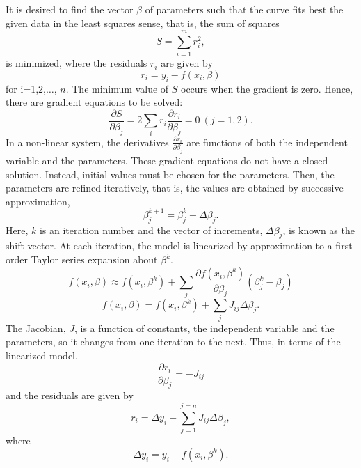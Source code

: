 \documentclass[a4paper,10pt]{report}
\begin{document}
It is desired to find the vector $\beta$ of
parameters such that the curve fits best the given data in the least
squares sense, that is, the sum of squares
\begin{equation}
    S=\sum_{i=1}^{m}r_i^2 ,
\end{equation}
is minimized, where the residuals $r_i$ are given by
\begin{equation}
    r_i = y_i - f(x_i,\beta)
\end{equation}
for i=1,2,$\dots$, $n$.
\newline
The minimum value of $S$ occurs when the gradient is zero. Hence, there are gradient equations to be solved:
\begin{equation}
    \frac{\partial S}{\partial \beta_j}=2\sum_i r_i\frac{\partial r_i}{\partial \beta_j}=0 \ (j=1,2).
\end{equation}
In a non-linear system, the derivatives $\frac{\partial
r_i}{\partial \beta_j}$ are functions of both the independent
variable and the parameters. These gradient equations do not have a
closed solution. Instead, initial values must be chosen for the
parameters. Then, the parameters are refined iteratively, that is,
the values are obtained by successive approximation,
\begin{equation}
    \beta_j^{k+1}=\beta^k_j+\Delta \beta_j.
\end{equation}
Here, $k$ is an iteration number and the vector of increments,
$\Delta \beta_j$, is known as the shift vector. At each iteration,
the model is linearized by approximation to a first-order Taylor
series expansion about $\beta^k$.
\begin{equation}
    f(x_i,\beta)\approx f(x_i,\beta^k) +\sum_j \frac{\partial f(x_i, \beta^k)}{\partial \beta_j} \left(\beta^k_j -\beta_j \right)
\end{equation}
\begin{equation}
 f(x_i,\beta) =f(x_i, \beta^k)+\sum_j J_{ij} \Delta\beta_j.
\end{equation}
The Jacobian, $J$, is a function of constants, the independent
variable and the parameters, so it changes from one iteration to the
next. Thus, in terms of the linearized model,
\begin{equation}
\frac{\partial r_i}{\partial \beta_j}=-J_{ij}
\end{equation}
and the residuals are given by
\begin{equation}
    r_i=\Delta y_i- \sum_{j=1}^{j=n} J_{ij}\Delta\beta_j,
\end{equation}
where
\begin{equation}
 \Delta y_i=y_i- f(x_i, \beta^k).
\end{equation}
\end{document}
